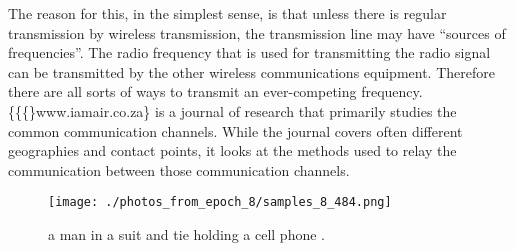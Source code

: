 \documentclass{article}%
\begin{document}
The reason for this, in the simplest sense, is that unless there is regular transmission by wireless transmission, the transmission line may have “sources of frequencies”. The radio frequency that is used for transmitting the radio signal can be transmitted by the other wireless communications equipment. Therefore there are all sorts of ways to transmit an ever{-}competing frequency.\newline%
\{\{\{\}www.iamair.co.za\} is a journal of research that primarily studies the common communication channels. While the journal covers often different geographies and contact points, it looks at the methods used to relay the communication between those communication channels.\newline%

%


\begin{figure}[h!]%
\centering%
\texttt{[image: ./photos\_from\_epoch\_8/samples\_8\_484.png]}%
\caption{a man in a suit and tie holding a cell phone .}%
\end{figure}

%
\end{document}
